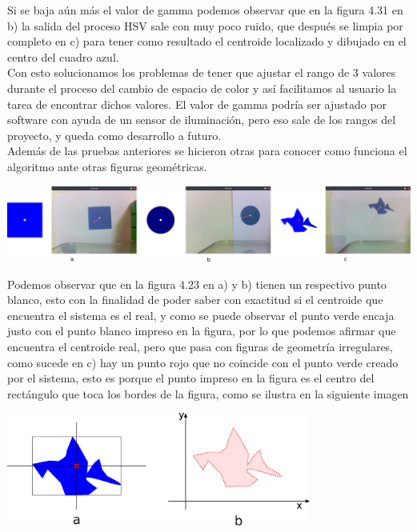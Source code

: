 Si se baja aún más el valor de gamma podemos observar que en la figura 4.31 en b) la salida del proceso HSV sale con muy
poco ruido, que después se limpia por completo en c) para tener como resultado el centroide localizado y dibujado en el
centro del cuadro azul.\\
Con esto solucionamos los problemas de tener que ajustar el rango de 3 valores durante el proceso del cambio de espacio de color
y así facilitamos al usuario la tarea de encontrar dichos valores. El valor de gamma podría ser ajustado por software con
ayuda de un sensor de iluminación, pero eso sale de los rangos del proyecto, y queda como desarrollo a futuro.\\
Además de las pruebas anteriores se hicieron otras para conocer como funciona el algoritmo ante otras figuras geométricas.
\begin{center}
	\includegraphics[width=1.0\textwidth]{Contenido/Cuerpo/Capitulo4/Fig28.eps}
	\label{Fig9}
\end{center}
Podemos observar que en la figura 4.23 en a) y b) tienen un respectivo punto blanco, esto con la finalidad de poder saber con exactitud si
el centroide que encuentra el sistema es el real, y como se puede observar el punto verde encaja justo con el punto blanco
impreso en la figura, por lo que podemos afirmar que encuentra el centroide real, pero que pasa con figuras de geometría irregulares,
como sucede en c) hay un punto rojo que no coincide con el punto verde creado por el sistema, esto es porque el punto impreso
en la figura es el centro del rectángulo que toca los bordes de la figura, como se ilustra en la siguiente imagen
\begin{center}
	\includegraphics[width=0.75\textwidth]{Contenido/Cuerpo/Capitulo4/Fig29.eps}
	\label{Fig9}
\end{center}
